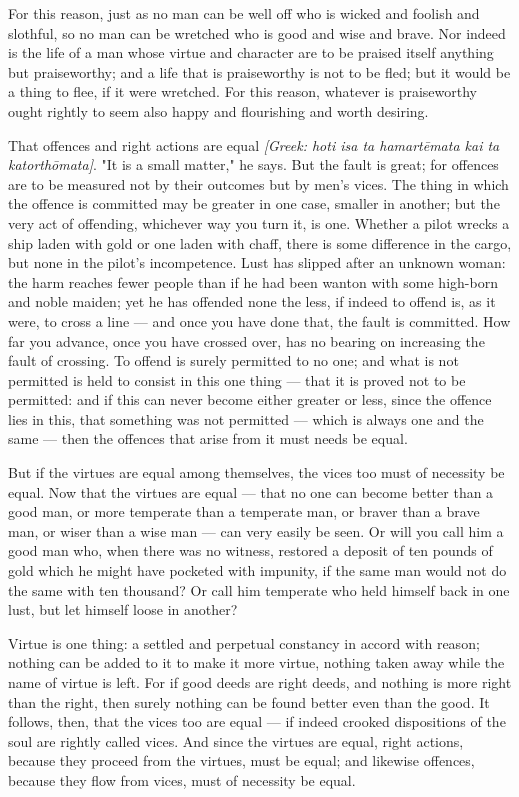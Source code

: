  For this reason, just as no man can be well off who is wicked and foolish and slothful, so no man can be wretched who is good and wise and brave. Nor indeed is the life of a man whose virtue and character are to be praised itself anything but praiseworthy; and a life that is praiseworthy is not to be fled; but it would be a thing to flee, if it were wretched. For this reason, whatever is praiseworthy ought rightly to seem also happy and flourishing and worth desiring.

 That offences and right actions are equal \textit{[Greek: hoti isa ta hamartēmata kai ta katorthōmata]}. "It is a small matter," he says. But the fault is great; for offences are to be measured not by their outcomes but by men's vices. The thing in which the offence is committed may be greater in one case, smaller in another; but the very act of offending, whichever way you turn it, is one. Whether a pilot wrecks a ship laden with gold or one laden with chaff, there is some difference in the cargo, but none in the pilot's incompetence. Lust has slipped after an unknown woman: the harm reaches fewer people than if he had been wanton with some high-born and noble maiden; yet he has offended none the less, if indeed to offend is, as it were, to cross a line — and once you have done that, the fault is committed. How far you advance, once you have crossed over, has no bearing on increasing the fault of crossing. To offend is surely permitted to no one; and what is not permitted is held to consist in this one thing — that it is proved not to be permitted: and if this can never become either greater or less, since the offence lies in this, that something was not permitted — which is always one and the same — then the offences that arise from it must needs be equal.

 But if the virtues are equal among themselves, the vices too must of necessity be equal. Now that the virtues are equal — that no one can become better than a good man, or more temperate than a temperate man, or braver than a brave man, or wiser than a wise man — can very easily be seen. Or will you call him a good man who, when there was no witness, restored a deposit of ten pounds of gold which he might have pocketed with impunity, if the same man would not do the same with ten thousand? Or call him temperate who held himself back in one lust, but let himself loose in another?

 Virtue is one thing: a settled and perpetual constancy in accord with reason; nothing can be added to it to make it more virtue, nothing taken away while the name of virtue is left. For if good deeds are right deeds, and nothing is more right than the right, then surely nothing can be found better even than the good. It follows, then, that the vices too are equal — if indeed crooked dispositions of the soul are rightly called vices. And since the virtues are equal, right actions, because they proceed from the virtues, must be equal; and likewise offences, because they flow from vices, must of necessity be equal.


